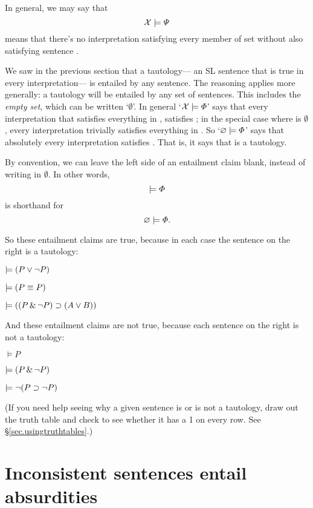 In general, we may say that $$\mathcal{X}{}\models\varPsi{}$$ means that there's no interpretation satisfying every member of set \metaSetX{} without also satisfying sentence \metaB{}.

We saw in the previous section that a tautology---  an SL sentence that is true in every interpretation--- is entailed by any sentence. The reasoning applies more generally: a tautology will be entailed by any set of sentences. This includes the \emph{empty set}, which can be written `$\emptyset$'. In general `$\mathcal{X}{} \models \varPhi{}$' says that every interpretation that satisfies everything in \metaSetX{}, satisfies \metaA{}; in the special case where \metaSetX{} is $\emptyset$, every interpretation trivially satisfies everything in \metaSetX{}. So `$\varnothing \models \varPhi{}$' says that absolutely every interpretation satisfies \metaA{}. That is, it says that \metaA{} is a tautology.

By convention, we can leave the left side of an entailment claim blank, instead of writing in $\emptyset$. In other words, $$\models \varPhi{} $$ is shorthand for $$ \varnothing \models \varPhi{}.$$

So these entailment claims are true, because in each case the sentence on the right is a tautology:

\begin{earg}
\item[] $\models (P \vee \neg P)$
\item[] $\models (P \equiv P)$
\item[] $\models ((P \,\&\,\neg P)\supset (A \vee B))$
\end{earg}

And these entailment claims are not true, because each sentence on the right is not a tautology:

\begin{earg}
\item[] $\models P$
\item[] $\models (P \,\&\, \neg P)$
\item[] $\models \neg(P \supset \neg P)$
\end{earg}

(If you need help seeing why a given sentence is or is not a tautology, draw out the truth table and check to see whether it has a 1 on every row. See \S\ref{sec.usingtruthtables}.)

\section{Inconsistent sentences entail absurdities}

